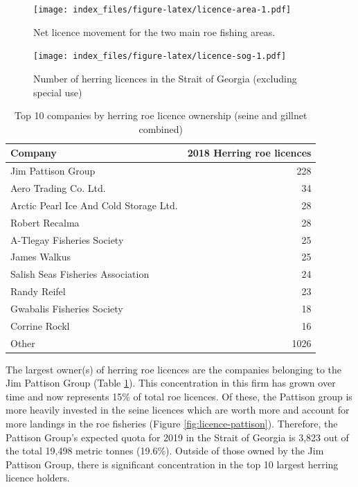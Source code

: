 \documentclass[]{article}
\theoremstyle{definition}
\theoremstyle{definition}
\theoremstyle{definition}
\theoremstyle{remark}
\begin{document}
\begin{figure}
\centering
\texttt{[image: index\_files/figure-latex/licence-area-1.pdf]}
\caption{\label{fig:licence-area}Net licence movement for the two main roe
fishing areas.}
\end{figure}

\begin{figure}
\centering
\texttt{[image: index\_files/figure-latex/licence-sog-1.pdf]}
\caption{\label{fig:licence-sog}Number of herring licences in the Strait of
Georgia (excluding special use)}
\end{figure}

\begin{table}

\caption{\label{tab:licence-table}Top 10 companies by herring roe licence ownership (seine and gillnet combined)}
\centering
\begin{tabular}[t]{l|r}
\hline
Company & 2018 Herring roe licences\\
\hline
Jim Pattison Group & 228\\
\hline
Aero Trading Co. Ltd. & 34\\
\hline
Arctic Pearl Ice And Cold Storage Ltd. & 28\\
\hline
Robert Recalma & 28\\
\hline
A-Tlegay Fisheries Society & 25\\
\hline
James Walkus & 25\\
\hline
Salish Seas Fisheries Association & 24\\
\hline
Randy Reifel & 23\\
\hline
Gwabalis Fisheries Society & 18\\
\hline
Corrine Rockl & 16\\
\hline
Other & 1026\\
\hline
\end{tabular}
\end{table}

The largest owner(s) of herring roe licences are the companies belonging
to the Jim Pattison Group (Table \ref{tab:licence-table}). This
concentration in this firm has grown over time and now represents 15\%
of total roe licences. Of these, the Pattison group is more heavily
invested in the seine licences which are worth more and account for more
landings in the roe fisheries (Figure \ref{fig:licence-pattison}).
Therefore, the Pattison Group's expected quota for 2019 in the Strait of
Georgia is 3,823 out of the total 19,498 metric tonnes (19.6\%). Outside
of those owned by the Jim Pattison Group, there is significant
concentration in the top 10 largest herring licence holders.
\end{document}
